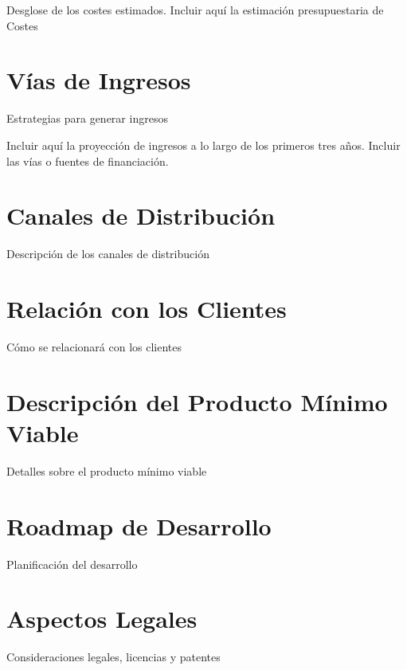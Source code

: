 Desglose de los costes estimados. Incluir aquí la estimación presupuestaria de Costes

\section{Vías de Ingresos}
Estrategias para generar ingresos

Incluir aquí la proyección de ingresos a lo largo de los primeros tres años. Incluir las vías o fuentes de financiación.

\section{Canales de Distribución}

Descripción de los canales de distribución

\section{Relación con los Clientes}

Cómo se relacionará con los clientes

\section{Descripción del Producto Mínimo Viable}

Detalles sobre el producto mínimo viable

\section{Roadmap de Desarrollo}

Planificación del desarrollo

\section{Aspectos Legales}

Consideraciones legales, licencias y patentes
